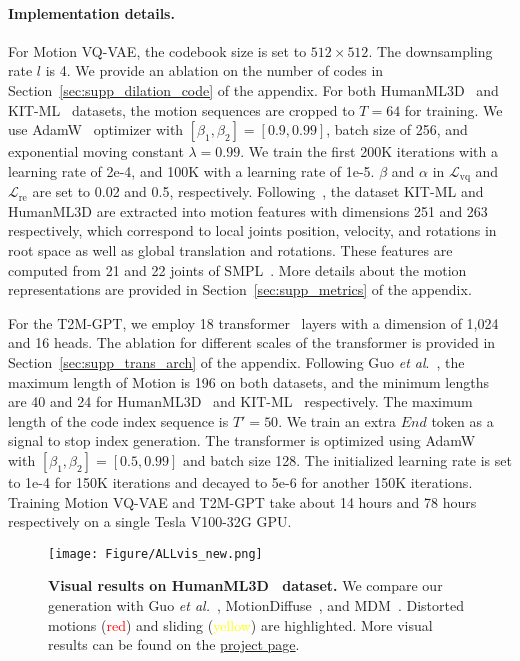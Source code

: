 \documentclass[10pt,twocolumn,letterpaper]{article}
\begin{document}
\paragraph{Implementation details.} 
For Motion VQ-VAE, the codebook size is set to $512 \times 512$. The downsampling rate $l$ is 4. 
We provide an ablation on the number of codes in Section~\ref{sec:supp_dilation_code} of the appendix. For both HumanML3D~\cite{guo2022generating} and KIT-ML~\cite{plappert2016kit} datasets, the motion sequences are cropped to $T=64$ for training. We use AdamW~\cite{loshchilov2018decoupled} optimizer with $[\beta_1, \beta_2] = [0.9, 0.99]$, batch size of 256, and exponential moving constant $\lambda=0.99$. We train the first 200K iterations with a learning rate of 2e-4, and 100K with a learning rate of 1e-5. $\beta$ and $\alpha$ in $\mathcal{L}_{\text{vq}}$ and $\mathcal{L}_{\text{re}}$ are set to 0.02 and 0.5, respectively. Following~\cite{guo2022generating}, the dataset KIT-ML and HumanML3D are extracted into motion features with dimensions 251 and 263 respectively, which correspond to local joints position, velocity, and rotations in root space as well as global translation and rotations. These features are computed from 21 and 22 joints of SMPL~\cite{loper2015smpl}. More details about the motion representations are provided in Section~\ref{sec:supp_metrics} of the appendix.

For the T2M-GPT, we employ 18 transformer~\cite{vaswani2017attention} layers with a dimension of 1,024 and 16 heads. 
The ablation for different scales of the transformer is provided in Section~\ref{sec:supp_trans_arch} of the appendix. 
Following Guo \textit{et al}.~\cite{guo2022generating}, the maximum length of Motion is 196 on both datasets, and the minimum lengths are 40 and 24 for HumanML3D~\cite{guo2022generating} and KIT-ML~\cite{plappert2016kit} respectively. The maximum length of the code index sequence is $T'=50$. We train an extra $\mathit{End}$ token as a signal to stop index generation. The transformer is optimized using AdamW~\cite{loshchilov2018decoupled} with $[\beta_1, \beta_2] = [0.5, 0.99]$ and batch size 128. The initialized learning rate is set to 1e-4 for 150K iterations and decayed to 5e-6 for another 150K iterations. Training Motion VQ-VAE and T2M-GPT take about 14 hours and 78 hours respectively on a single Tesla V100-32G GPU. 

\begin{figure*}[tp]
    \centering
    \texttt{[image: Figure/ALLvis\_new.png]}
    \caption{\textbf{Visual results on HumanML3D~\cite{guo2022generating} dataset.} We compare our generation with Guo \textit{et al.}~\cite{guo2022generating}, MotionDiffuse~\cite{zhang2022motiondiffuse}, and MDM~\cite{tevet2022MDM}. Distorted motions (\textcolor{red}{red}) and sliding (\textcolor{yellow}{yellow}) are highlighted. More visual results can be found on the \href{https://mael-zys.github.io/T2M-GPT/}{project page}.}
    \label{fig:visual}
\end{figure*}
\end{document}

